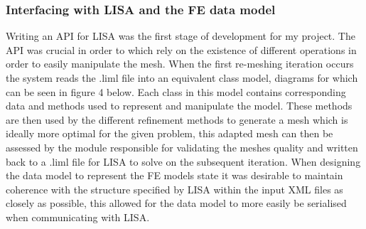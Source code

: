 \documentclass{article}
\begin{document}
\subsubsection{Interfacing with LISA and the FE data model}
Writing an API for LISA was the first stage of development for my project. The API was crucial in order to  which rely on the existence of different operations in order to easily manipulate the mesh. When the first re-meshing iteration occurs the system reads the .liml file into an equivalent class model, diagrams for which can be seen in figure 4 below. Each class in this model contains corresponding data and methods used to represent and manipulate the model. These methods are then used by the different refinement methods to generate a mesh which is ideally more optimal for the given problem, this adapted mesh can then be assessed by the module responsible for validating the meshes quality and written back to a .liml file for LISA to solve on the subsequent iteration. When designing the data model to represent the FE models state it was desirable to maintain coherence with the structure specified by LISA within the input XML files as closely as possible, this allowed for the data model to more easily be serialised when communicating with LISA. 
\end{document}
